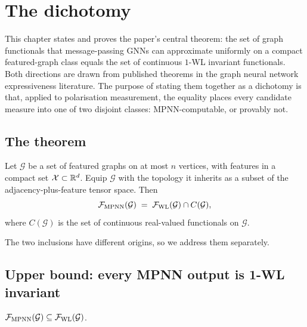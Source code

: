 
\section{The dichotomy}\label{sec:dichotomy}

This chapter states and proves the paper's central theorem: the set of
graph functionals that message-passing GNNs can approximate uniformly
on a compact featured-graph class equals the set of continuous
$1$-WL invariant functionals. Both directions are drawn from published
theorems in the graph neural network expressiveness literature. The
purpose of stating them together as a dichotomy is that, applied to
polarisation measurement, the equality places every candidate measure
into one of two disjoint classes: MPNN-computable, or provably not.

\subsection{The theorem}

\begin{theorem}\label{thm:dichotomy}
Let $\mathcal{G}$ be a set of featured graphs on at most $n$
vertices, with features in a compact set $\mathcal{X} \subset \mathbb{R}^d$.
Equip $\mathcal{G}$ with the topology it inherits as a subset of the
adjacency-plus-feature tensor space. Then
\[
\mathcal{F}_{\mathrm{MPNN}}(\mathcal{G}) \;=\; \mathcal{F}_{\mathrm{WL}}(\mathcal{G})
\cap C(\mathcal{G}),
\]
where $C(\mathcal{G})$ is the set of continuous real-valued
functionals on $\mathcal{G}$.
\end{theorem}

The two inclusions have different origins, so we address them
separately.

\subsection{Upper bound: every MPNN output is 1-WL invariant}

\begin{proposition}\label{prop:upper}
$\mathcal{F}_{\mathrm{MPNN}}(\mathcal{G}) \subseteq \mathcal{F}_{\mathrm{WL}}(\mathcal{G})$.
\end{proposition}

